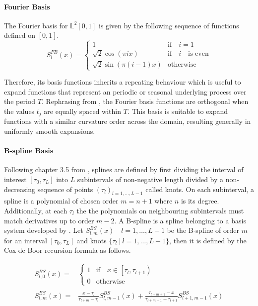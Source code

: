 \documentclass[11pt,twoside,a4paper]{article}
\begin{document}
	
	\paragraph{Fourier Basis}
	The Fourier basis for $\mathbb{L}^2[0,1]$ is given by the following sequence of functions defined on $[0,1]$.
	\begin{equation}
		S_{i}^{FB}(x) = 
		\begin{cases}
			1 & \text{if} \quad i = 1\\
			\sqrt{2} \cos(\pi i x) & \text{if} \quad i \quad \text{is even} \\
			\sqrt{2} \sin(\pi (i-1)x) & \text{otherwise}
		\end{cases}
	\end{equation}
	
	Therefore, its basis functions inherits a repeating behaviour which is useful to expand functions that represent an periodic or seasonal underlying process over the period $T$. Rephrasing from \cite{ramsay_functional_2005}, the Fourier basis functions are orthogonal when the values $t_j$ are equally spaced within $T$. This basis is suitable to expand functions with a similar curvature order across the domain, resulting generally in uniformly smooth expansions.  

	\paragraph{B-spline Basis} Following chapter 3.5 from \cite{ramsay_functional_2005}, splines are defined by first dividing the interval of interest $[\tau_0, \tau_L]$ into $L$ subintervals of non-negative length divided by a non-decreasing sequence of points $(\tau_l)_{l = 1,\dots, L-1}$ called knots. On each subinterval, a spline is a polynomial of chosen order $m = n+1$ where $n$ is its degree. Additionally, at each $\tau_l$ the the polynomials on neighbouring subintervals must match derivatives up to order $m-2$.
	A B-spline is a spline belonging to a basis system developed by \cite{de_boor_practical_1978}. Let $S_{l,m}^{BS}(x) \quad l = 1,\dots,L-1$ be the B-spline of order $m$ for an interval $[\tau_0, \tau_L]$ and knots $\{\tau_l \: \vert \: l = 1,\dots, L-1\}$, then it is defined by the Cox-de Boor recursion formula as follows. 

	\begin{equation}
		\begin{split}
			S_{l,0}^{BS}(x) = &
			\begin{cases}
				1 & \text{if} \quad x \in \left[\tau_l, \tau_{l+1}\right)\\
				0 & \text{otherwise}
			\end{cases}\\ \\
			S_{l,m}^{BS}(x) = &\frac{x - \tau_l}{\tau_{l+m} - \tau_l} S_{l,m-1}^{BS}(x) + \frac{\tau_{l+m+1} - x}{\tau_{l+m+1} - \tau_{l+1}} S_{l+1,m-1}^{BS}(x)
		\end{split}
	\end{equation}
	
\end{document}
